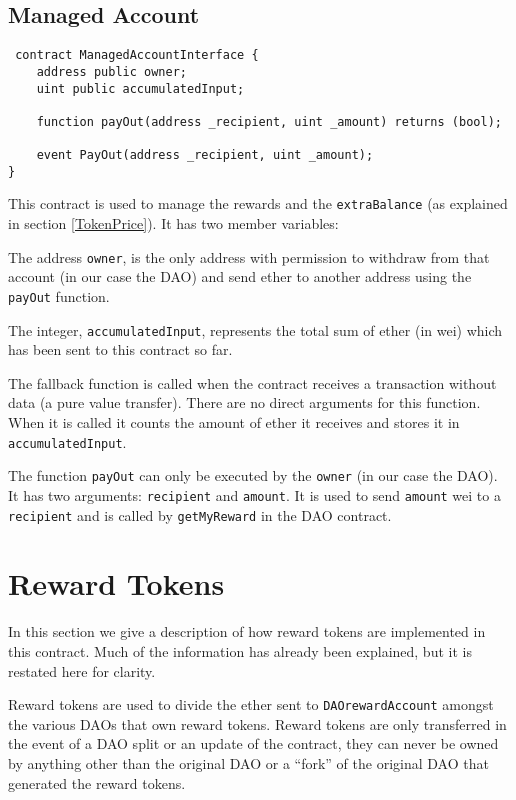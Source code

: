 \documentclass[9pt,oneside]{amsart}
\begin{document}
\subsection{Managed Account}
\begin{verbatim}
 contract ManagedAccountInterface {
    address public owner;
    uint public accumulatedInput;

    function payOut(address _recipient, uint _amount) returns (bool);

    event PayOut(address _recipient, uint _amount);
}
\end{verbatim}
\begin{multicols}{2}
This contract is used to manage the rewards and the \verb|extraBalance| (as explained in section \ref{TokenPrice}). It has two member variables:

The address \verb|owner|, is the only address with permission to withdraw from that account (in our case the DAO) and send ether to another address using the \verb|payOut| function.

The integer, \verb|accumulatedInput|, represents the total sum of ether (in wei) which has been sent to this contract so far.

The fallback function is called when the contract receives a transaction without data (a pure value transfer). There are no direct arguments for this function. When it is called it counts the amount of ether it receives and stores it in \verb|accumulatedInput|.

The function \verb|payOut| can only be executed by the \verb|owner| (in our case the DAO). It has two arguments: \verb|recipient| and \verb|amount|. It is used to send \verb|amount| wei to a \verb|recipient| and is called by \verb|getMyReward| in the DAO contract.

\section{Reward Tokens} \label{RewardToken}

In this section we give a description of how reward tokens are implemented in this contract. Much of the information has already been explained, but it is restated here for clarity. 

Reward tokens are used to divide the ether sent to \verb|DAOrewardAccount| amongst the various DAOs that own reward tokens. Reward tokens are only transferred in the event of a DAO split or an update of the contract, they can never be owned by anything other than the original DAO or a “fork” of the original DAO that generated the reward tokens. 


\end{multicols}
\end{document}
